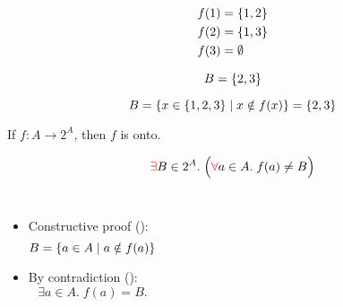 \begin{frame}{}
  \begin{align*}
    f(1) &= \{1, 2\} \\
    f(2) &= \{1, 3\} \\
    f(3) &= \emptyset
  \end{align*}

  \pause
  \[
    B = \{2, 3\}
  \]

  \pause
  \[
    B = \{x \in \{1, 2, 3\} \mid x \notin f(x)\} = \{2, 3\}
  \]
\end{frame}

\begin{frame}{}
  \begin{theorem}
    If $f: A \to 2^{A}$, then $f$ is  onto.
  \end{theorem}

  \[
    \textcolor{red}{\exists} B \in 2^{A}.\; \Big(\textcolor{red}{\forall} a \in A.\; f(a) \neq B\Big)
  \]

  \pause
  \begin{columns}[t]
      \begin{itemize}
        \item<2-> Constructive proof (\red{$\exists$}):
          \[
            B = \{a \in A \mid a \notin f(a)\}
          \]
        \item<4-> By contradiction (\red{$\forall$}):
          \[
            \exists a \in A.\; f(a) = B.
          \]
      \end{itemize}
  \end{columns}

  \vspace{-0.30cm}

  \vspace{-0.60cm}
\end{frame}

